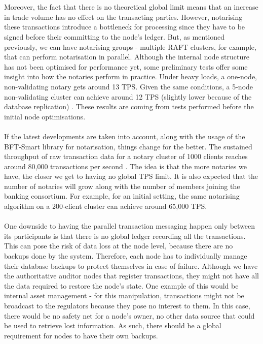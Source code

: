 \documentclass[12pt,twoside]{article}
\begin{document}
\\ \\
Moreover, the fact that there is no theoretical global limit means that an increase in trade volume has no effect on the transacting parties. However, notarising these transactions introduce a bottleneck for processing since they have to be signed before their committing to the node's ledger. But, as mentioned previously, we can have notarising groups - multiple RAFT clusters, for example, that can perform notarisation in parallel. Although the internal node structure has not been optimised for performance yet, some preliminary tests offer some insight into how the notaries perform in practice. Under heavy loads, a one-node, non-validating notary gets around 13 TPS. Given the same conditions, a 5-node non-validating cluster can achieve around 12 TPS (slightly lower because of the database replication) \cite{jira}. These results are coming from tests performed before the initial node optimisations. 
\\ \\
If the latest developments are taken into account, along with the usage of the BFT-Smart library for notarisation, things change for the better. The sustained throughput of raw transaction data for a notary cluster of 1000 clients reaches around 80,000 transactions per second \cite{bftsmart}. The idea is that the more notaries we have, the closer we get to having no global TPS limit. It is also expected that the number of notaries will grow along with the number of members joining the banking consortium. For example, for an initial setting, the same notarising algorithm on a 200-client cluster can achieve around 65,000 TPS.  
\\ \\
One downside to having the parallel transaction messaging happen only between its participants is that there is no global ledger recording all the transactions. This can pose the risk of data loss at the node level, because there are no backups done by the system. Therefore, each node has to individually manage their database backups to protect themselves in case of failure. Although we have the authoritative auditor nodes that register transactions, they might not have all the data required to restore the node's state. One example of this would be internal asset management - for this manipulation, transactions might not be broadcast to the regulators because they pose no interest to them. In this case, there would be no safety net for a node's owner, no other data source that could be used to retrieve lost information. As such, there should be a global requirement for nodes to have their own backups.
\end{document}
